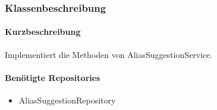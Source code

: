 \subsubsection*{Klassenbeschreibung}%
\paragraph*{Kurzbeschreibung}
Implementiert die Methoden von AliasSuggestionService.
\paragraph*{Benötigte Repositories}
\begin{itemize}
    \item AliasSuggestionRepository
\end{itemize}